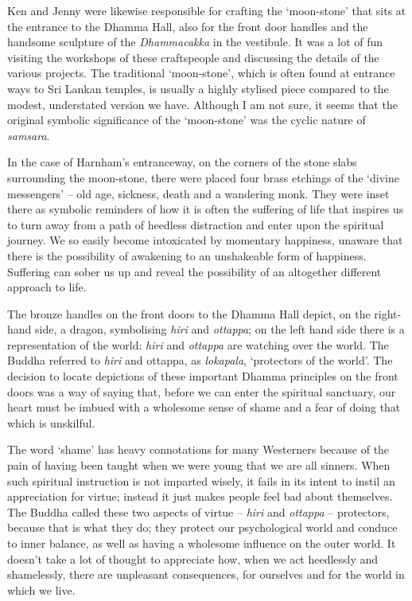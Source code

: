 Ken and Jenny were likewise responsible for crafting the `moon-stone'
that sits at the entrance to the Dhamma Hall, also for the front door
handles and the handsome sculpture of the \emph{Dhammacakka} in the vestibule.
It was a lot of fun visiting the workshops of these craftspeople and
discussing the details of the various projects. The traditional
`moon-stone', which is often found at entrance ways to Sri Lankan
temples, is usually a highly stylised piece compared to the modest,
understated version we have. Although I am not sure, it seems that the original symbolic
significance of the `moon-stone' was the cyclic nature of \emph{samsara}\cite{sandakada}.

In the case of Harnham's entranceway, on the corners of the stone slabs
surrounding the moon-stone, there were placed four brass etchings of the
`divine messengers\cite{divine}' -- old age, sickness, death and a wandering
monk. They were inset there as symbolic reminders of how it is often the
suffering of life that inspires us to turn away from a path of heedless
distraction and enter upon the spiritual journey. We so easily become
intoxicated by momentary happiness, unaware that there is the
possibility of awakening to an unshakeable form of happiness. Suffering
can sober us up and reveal the possibility of an altogether different
approach to life.

The bronze handles on the front doors to the Dhamma Hall depict, on the
right-hand side, a dragon, symbolising \emph{hiri} and \emph{ottappa}\cite{hiri};
on the left hand side there is a representation of the world: \emph{hiri} and
\emph{ottappa} are watching over the world. The Buddha referred to
\emph{hiri} and ottappa, as \emph{lokapala}, `protectors of the world'.
The decision to locate depictions of these important Dhamma principles
on the front doors was a way of saying that, before we can enter the
spiritual sanctuary, our heart must be imbued with a wholesome sense of
shame and a fear of doing that which is unskilful.

The word `shame' has heavy connotations for many Westerners because of
the pain of having been taught when we were young that we are all
sinners. When such spiritual instruction is not imparted wisely, it
fails in its intent to instil an appreciation for virtue; instead it
just makes people feel bad about themselves. The Buddha called these two
aspects of virtue -- \emph{hiri} and \emph{ottappa} -- protectors,
because that is what they do; they protect our psychological world and
conduce to inner balance, as well as having a wholesome influence on the
outer world. It doesn't take a lot of thought to appreciate how, when we
act heedlessly and shamelessly, there are unpleasant consequences, for
ourselves and for the world in which we live.

